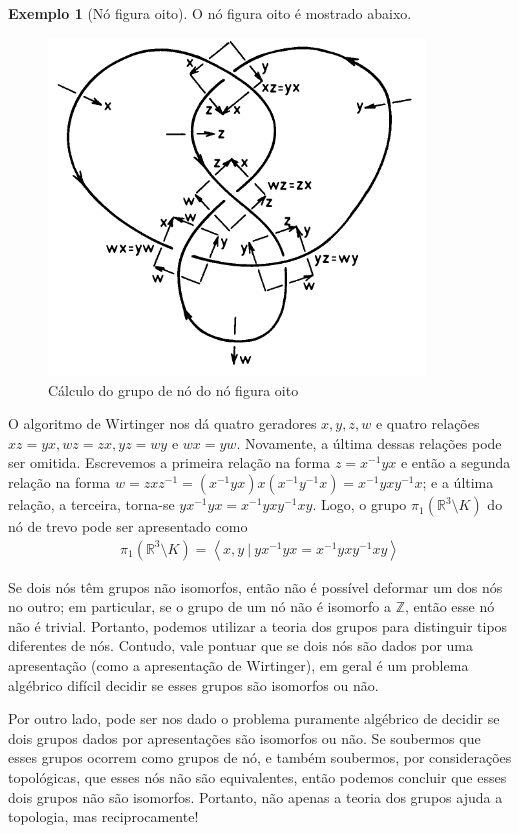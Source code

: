 \documentclass[a4paper,portuguese,11pt,twoside, leqno]{book}
\theoremstyle{definition}
\newtheorem{example}{Exemplo}[section]
\begin{document}
	\begin{example}[Nó figura oito]
		O nó figura oito é mostrado abaixo.
		\begin{figure}[H]
			\begin{center}
				\includegraphics[width=10cm]{Images/gruponooito.png}
			\end{center}\caption{Cálculo do grupo de nó do nó figura oito}
			\label{grupo no de oito}	
		\end{figure}
		\par\vspace{0.3cm} O algoritmo de Wirtinger nos dá quatro geradores $x,y,z,w$ e quatro relações $xz = yx, wz = zx, yz = wy$ e $wx = yw$. Novamente, a última dessas relações pode ser omitida. Escrevemos a primeira relação na forma $z = x^{-1}yx$ e então a segunda relação na forma $w = zxz^{-1} = (x^{-1}yx)x(x^{-1}y^{-1}x) = x^{-1}yxy^{-1}x$; e a última relação, a terceira, torna-se $yx^{-1}yx = x^{-1}yxy^{-1}xy$. Logo, o grupo $\pi_1(\mathbb{R}^3\setminus K)$ do nó de trevo pode ser apresentado como
		\begin{align*}
		\pi_1(\mathbb{R}^3\setminus K) = \left< x,y \ | \ yx^{-1}yx = x^{-1}yxy^{-1}xy \right>
		\end{align*}
	\end{example}
	\par\vspace{0.3cm} Se dois nós têm grupos não isomorfos, então não é possível deformar um dos nós no outro; em particular, se o grupo de um nó não é isomorfo a $\mathbb{Z}$, então esse nó não é trivial. Portanto, podemos utilizar a teoria dos grupos para distinguir tipos diferentes de nós. Contudo, vale pontuar que se dois nós são dados por uma apresentação (como a apresentação de Wirtinger), em geral é um problema algébrico difícil decidir se esses grupos são isomorfos ou não.
	\par\vspace{0.3cm} Por outro lado, pode ser nos dado o problema puramente algébrico de decidir se dois grupos dados por apresentações são isomorfos ou não. Se soubermos que esses grupos ocorrem como grupos de nó, e também soubermos, por considerações topológicas, que esses nós não são equivalentes, então podemos concluir que esses dois grupos não são isomorfos. Portanto, não apenas a teoria dos grupos ajuda a topologia, mas reciprocamente!
	
\end{document}
